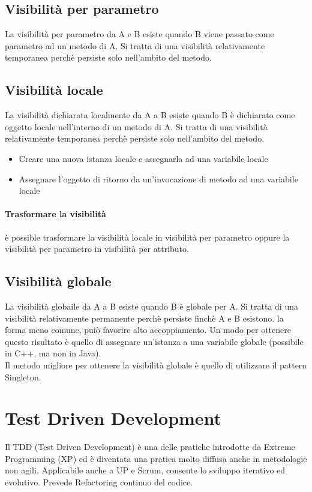 \subsection{Visibilità per parametro}
La visibilità per parametro da A e B esiste quando B viene passato come parametro ad un
metodo di A. Si tratta di una visibilità relativamente temporanea perchè persiste solo
nell'ambito del metodo.
\subsection{Visibilità locale}
La visibilità dichiarata localmente da A a B esiste quando B è dichiarato come oggetto locale
nell'interno di un metodo di A. Si tratta di una visibilità relativamente temporanea
perchè persiste solo nell'ambito del metodo.
\begin{itemize}
    \item Creare una nuova istanza locale e assegnarla ad una variabile locale
    \item Assegnare l'oggetto di ritorno da un'invocazione di metodo ad una variabile locale
\end{itemize}
\paragraph*{Trasformare la visibilità} è possible trasformare la visibilità locale
in visibilità per parametro oppure la visibilità per parametro in visibilità per attributo.
\subsection{Visibilità globale}
La visibilità globaile da A a B esiste quando B è globale per A. Si tratta di una
visibilità relativamente permanente perchè persiste finchè A e B esistono. la forma 
meno comune, puiò favorire alto accoppiamento. Un modo per ottenere questo risultato è quello
di assegnare un'istanza a una variabile globale (possibile in C++, ma non in Java).\\
Il metodo migliore per ottenere la visibilità globale è quello di utilizzare il pattern
Singleton.
\section{Test Driven Development}
Il TDD (Test Driven Development) è una delle pratiche introdotte da Extreme Programming (XP) 
ed è diventata una pratica molto diffusa anche in metodologie non agili. Applicabile
anche a UP e Scrum, consente lo sviluppo iterativo ed evolutivo. Prevede Refactoring continuo
del codice.
